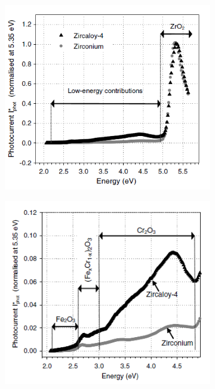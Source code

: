     \renewcommand{\coef}{0.45}
    \begin{figure}[h]
        \centering
        \begin{subfigure}{\coef\textwidth}
            \centering
            \includegraphics[width=\textwidth]{./src/figures/Benaboud2007-Fig4.png}
            \caption{}
            \label{fig:benaboud_minor_oxides_a}
        \end{subfigure}
        \begin{subfigure}{\coef\textwidth}
            \centering
            \includegraphics[width=\textwidth]{./src/figures/Benaboud2007-Fig5.png}
            \caption{}
            \label{fig:benaboud_minor_oxides_b}
        \end{subfigure}
        

\end{figure}
